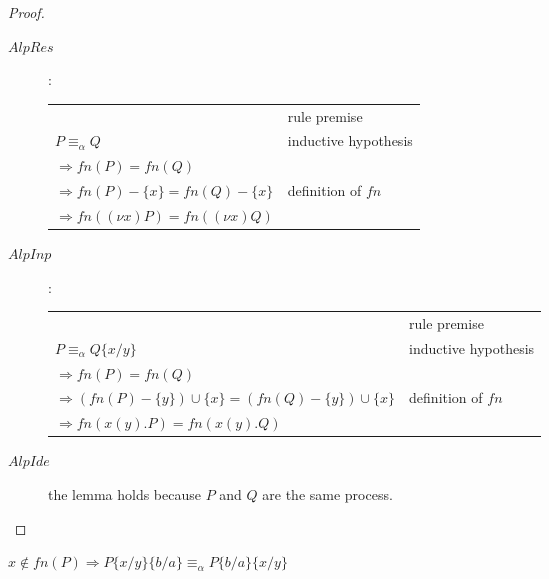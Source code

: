 \begin{lemma}
\begin{proof}
\begin{description}
      \item[$AlpRes$]:
	\begin{center}
	  \begin{tabular}{ll}
	    &rule premise\\
	    $P\equiv_{\alpha}Q$&inductive hypothesis\\
	    $\Rightarrow fn(P)=fn(Q)$&\\
	    $\Rightarrow fn(P)- \{x\}=fn(Q)- \{x\}$&definition of $fn$\\
	    $\Rightarrow fn((\nu x)P)=fn((\nu x)Q)$&\\
	  \end{tabular}
	\end{center}
      \item[$AlpInp$]:
	\begin{center}
	  \begin{tabular}{ll}
	    &rule premise\\
	    $P\equiv_{\alpha}Q\{x/y\}$&inductive hypothesis\\
	    $\Rightarrow fn(P)=fn(Q)$&\\
	    $\Rightarrow (fn(P)-\{y\})\cup \{x\}=(fn(Q)-\{y\})\cup \{x\}$&definition of $fn$\\
	    $\Rightarrow fn(x(y).P)=fn(x(y).Q)$&\\
	  \end{tabular}
	\end{center}
      \item[$AlpIde$]
	the lemma holds because $P$ and $Q$ are the same process.
    \end{description}
  \end{proof}
\end{lemma}

\begin{lemma}\label{alphaequivalencecommutativity}
  $x\notin fn(P)\Rightarrow P\{x/y\}\{b/a\}\equiv_{\alpha}P\{b/a\}\{x/y\}$ 
\end{lemma}



